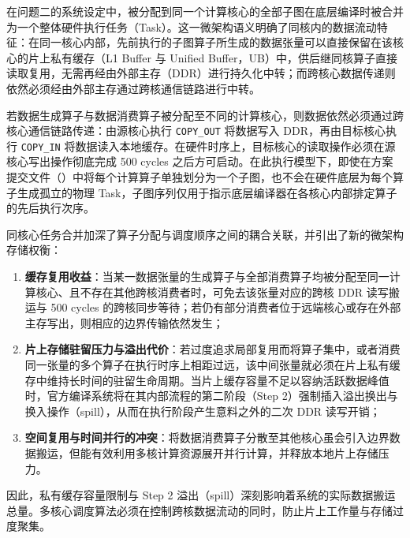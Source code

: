 \documentclass[anonymous,withtoc]{gmcm2026}
\providecommand{\tightlist}{\setlength{\itemsep}{0pt}\setlength{\parskip}{0pt}}
\begin{document}
在问题二的系统设定中，被分配到同一个计算核心的全部子图在底层编译时被合并为一个整体硬件执行任务（Task）。这一微架构语义明确了同核内的数据流动特征：在同一核心内部，先前执行的子图算子所生成的数据张量可以直接保留在该核心的片上私有缓存（L1 Buffer 与 Unified Buffer，UB）中，供后继同核算子直接读取复用，无需再经由外部主存（DDR）进行持久化中转；而跨核心数据传递则依然必须经由外部主存通过跨核通信链路进行中转。

若数据生成算子与数据消费算子被分配至不同的计算核心，则数据依然必须通过跨核心通信链路传递：由源核心执行 \texttt{COPY\_OUT} 将数据写入 DDR，再由目标核心执行 \texttt{COPY\_IN} 将数据读入本地缓存。在硬件时序上，目标核心的读取操作必须在源核心写出操作彻底完成 500 cycles 之后方可启动。在此执行模型下，即使在方案提交文件（\texttt{}）中将每个计算算子单独划分为一个子图，也不会在硬件底层为每个算子生成孤立的物理 Task，子图序列仅用于指示底层编译器在各核心内部排定算子的先后执行次序。

同核心任务合并加深了算子分配与调度顺序之间的耦合关联，并引出了新的微架构存储权衡：

\begin{enumerate}
\def\labelenumi{\arabic{enumi}.}
\tightlist
\item
  \textbf{缓存复用收益}：当某一数据张量的生成算子与全部消费算子均被分配至同一计算核心、且不存在其他跨核消费者时，可免去该张量对应的跨核 DDR 读写搬运与 500 cycles 的跨核同步等待；若仍有部分消费者位于远端核心或存在外部主存写出，则相应的边界传输依然发生；
\item
  \textbf{片上存储驻留压力与溢出代价}：若过度追求局部复用而将算子集中，或者消费同一张量的多个算子在执行时序上相距过远，该中间张量就必须在片上私有缓存中维持长时间的驻留生命周期。当片上缓存容量不足以容纳活跃数据峰值时，官方编译系统将在其内部流程的第二阶段（Step 2）强制插入溢出换出与换入操作（spill），从而在执行阶段产生意料之外的二次 DDR 读写开销；
\item
  \textbf{空间复用与时间并行的冲突}：将数据消费算子分散至其他核心虽会引入边界数据搬运，但能有效利用多核计算资源展开并行计算，并释放本地片上存储压力。
\end{enumerate}

因此，私有缓存容量限制与 Step 2 溢出（spill）深刻影响着系统的实际数据搬运总量。多核心调度算法必须在控制跨核数据流动的同时，防止片上工作量与存储过度聚集。
\end{document}
